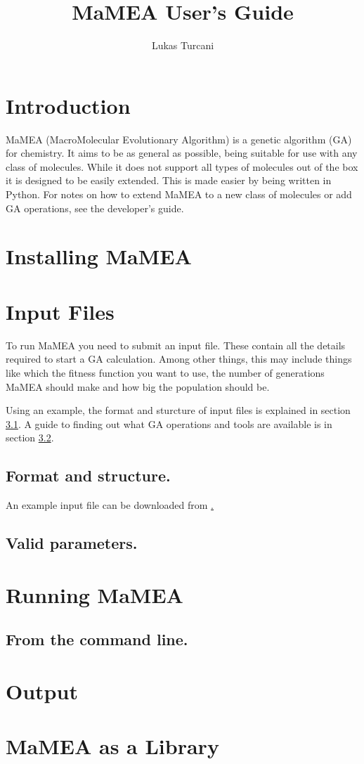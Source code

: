 \documentclass{article}
\title{MaMEA User's Guide}
\author{Lukas Turcani}
\begin{document}
\begin{titlepage}
	\maketitle
\end{titlepage}

\tableofcontents
\newpage
\section{Introduction}
MaMEA (MacroMolecular Evolutionary Algorithm) is a genetic algorithm (GA) for chemistry. It aims to be as general as possible, being suitable for use with any class of molecules. While it does not support all types of molecules out of the box it is designed to be easily extended. This is made easier by being written in Python. For notes on how to extend MaMEA to a new class of molecules or add GA operations, see the developer's guide.

\section{Installing MaMEA}

\section{Input Files}

To run MaMEA you need to submit an input file. These contain all the details required to start a GA calculation. Among other things, this may include things like which the fitness function you want to use, the number of generations MaMEA should make and how big the population should be.

Using an example, the format and sturcture of input files is explained in section \ref{input_files_format_and_structure}. A guide to finding out what GA operations and tools are available is in section \ref{input_files_valid_parameters}.

\subsection{Format and structure.}
\label{input_files_format_and_structure}

An example input file can be downloaded from \href{}.


\subsection{Valid parameters.}
\label{input_files_valid_parameters}

\section{Running MaMEA}

\subsection{From the command line.}


\section{Output}

\section{MaMEA as a Library}
\end{document}
